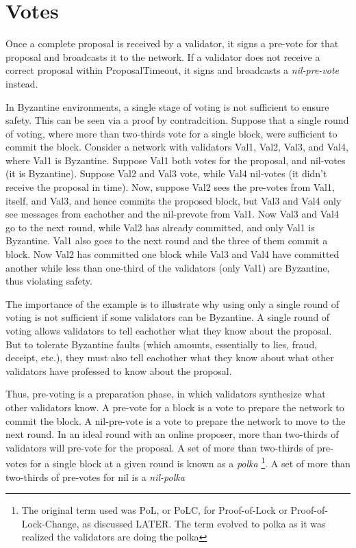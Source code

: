 \section{Votes}

Once a complete proposal is received by a validator, 
it signs a pre-vote for that proposal and broadcasts it to the network.
If a validator does not receive a correct proposal within ProposalTimeout, 
it signs and broadcasts a \emph{nil-pre-vote} instead.

In Byzantine environments, a single stage of voting is not sufficient to ensure safety.
This can be seen via a proof by contradcition.
Suppose that a single round of voting, where more than two-thirds vote for a single block, were sufficient to commit the block.
Consider a network with validators Val1, Val2, Val3, and Val4, where Val1 is Byzantine.
Suppose Val1 both votes for the proposal, and nil-votes (it is Byzantine).
Suppose Val2 and Val3 vote, while Val4 nil-votes (it didn't receive the proposal in time).
Now, suppose Val2 sees the pre-votes from Val1, itself, and Val3, and hence commits the proposed block,
but Val3 and Val4 only see messages from eachother and the nil-prevote from Val1.
Now Val3 and Val4 go to the next round, while Val2 has already committed, and only Val1 is Byzantine.
Val1 also goes to the next round and the three of them commit a block.
Now Val2 has committed one block while Val3 and Val4 have committed another while less than one-third of the validators (only Val1) are Byzantine,
thus violating safety. 

The importance of the example is to illustrate why using only a single round of voting
is not sufficient if some validators can be Byzantine.
A single round of voting allows validators to tell eachother what they know about the proposal.	
But to tolerate Byzantine faults (which amounts, essentially to lies, fraud, deceipt, etc.), 
they must also tell eachother what they know about what other validators have professed to know about the proposal.

Thus, pre-voting is a preparation phase, in which validators synthesize what other validators know.
A pre-vote for a block is a vote to prepare the network to commit the block.
A nil-pre-vote is a vote to prepare the network to move to the next round.
In an ideal round with an online proposer, more than two-thirds of validators will pre-vote for the proposal.
A set of more than two-thirds of pre-votes for a single block at a given round is known as a \emph{polka} \footnote{The original term used was PoL, or PoLC, for Proof-of-Lock or Proof-of-Lock-Change, as discussed LATER. The term evolved to polka as it was realized the validators are doing the polka}.
A set of more than two-thirds of pre-votes for nil is a \emph{nil-polka}

